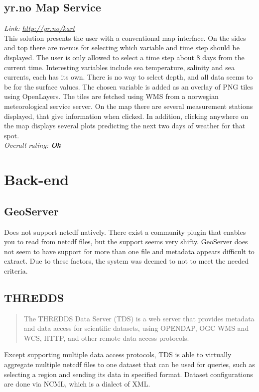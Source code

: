 \documentclass[11pt,a4paper,titlepage,oneside]{report}
\begin{document}
  \subsection{yr.no Map Service}
  \emph{Link: \url{http://yr.no/kart}} \\%
This solution presents the user with a conventional map interface. On the sides and top there are menus for selecting which variable and time step should be displayed. The user is only allowed to select a time step about 8 days from the current time. Interesting variables include sea temperature, salinity and sea currents, each has its own. There is no way to select depth, and all data seems to be for the surface values. The chosen variable is added as an overlay of \gls{PNG} tiles using OpenLayers. The tiles are fetched using \gls{WMS} from a norwegian meteorological service server. On the map there are several measurement stations displayed, that give information when clicked. In addition, clicking anywhere on the map displays several plots predicting the next two days of weather for that spot.
  \\ \emph{Overall rating: \textbf{Ok}}

\section{Back-end}

\subsection{GeoServer}
Does not support \gls{netcdf} natively. There exist a community plugin that enables you to read from \gls{netcdf} files, but the support seems very shifty. GeoServer does not seem to have support for more than one file and metadata appears difficult to extract. Due to these factors, the system was deemed to not to meet the needed criteria.

\subsection{THREDDS}
\begin{quote}
The \gls{THREDDS} Data Server (TDS) is a web server that provides metadata and data access for scientific datasets, using \gls{OPENDAP}, \gls{OGC} \gls{WMS} and \gls{WCS}, \gls{HTTP}, and other remote data access \glspl{protocol}. \cite{TDS:Web}
\end{quote}

  Except supporting multiple data access \glspl{protocol}, \gls{TDS} is able to virtually aggregate multiple \gls{netcdf} files to one dataset that can be used for queries, such as selecting a region and sending its data in specified format. Dataset configurations are done via \gls{NCML}, which is a dialect of \gls{XML}.
\end{document}
